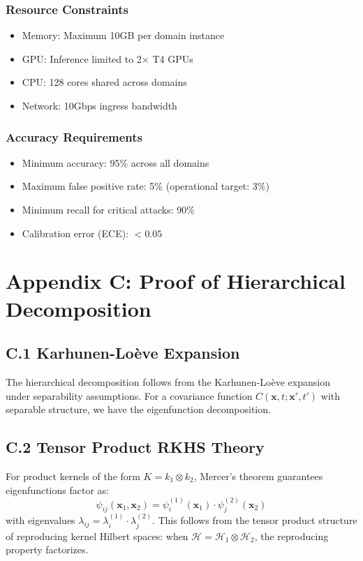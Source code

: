 \documentclass[12pt]{article}
\begin{document}
\subsubsection{Resource Constraints}
\begin{itemize}
\item Memory: Maximum 10GB per domain instance
\item GPU: Inference limited to 2× T4 GPUs
\item CPU: 128 cores shared across domains
\item Network: 10Gbps ingress bandwidth
\end{itemize}

\subsubsection{Accuracy Requirements}
\begin{itemize}
\item Minimum accuracy: 95\% across all domains
\item Maximum false positive rate: 5\% (operational target: 3\%)
\item Minimum recall for critical attacks: 90\%
\item Calibration error (ECE): $< 0.05$
\end{itemize}

\section{Appendix C: Proof of Hierarchical Decomposition}

\subsection{C.1 Karhunen-Loève Expansion}

The hierarchical decomposition follows from the Karhunen-Loève expansion under separability assumptions. For a covariance function $C(\mathbf{x},t;\mathbf{x}',t')$ with separable structure, we have the eigenfunction decomposition.

\subsection{C.2 Tensor Product RKHS Theory}

For product kernels of the form $K = k_1 \otimes k_2$, Mercer's theorem guarantees eigenfunctions factor as:
\begin{equation}
\psi_{ij}(\mathbf{x}_1, \mathbf{x}_2) = \psi_i^{(1)}(\mathbf{x}_1) \cdot \psi_j^{(2)}(\mathbf{x}_2)
\end{equation}
with eigenvalues $\lambda_{ij} = \lambda_i^{(1)} \cdot \lambda_j^{(2)}$. This follows from the tensor product structure of reproducing kernel Hilbert spaces: when $\mathcal{H} = \mathcal{H}_1 \otimes \mathcal{H}_2$, the reproducing property factorizes.
\end{document}
